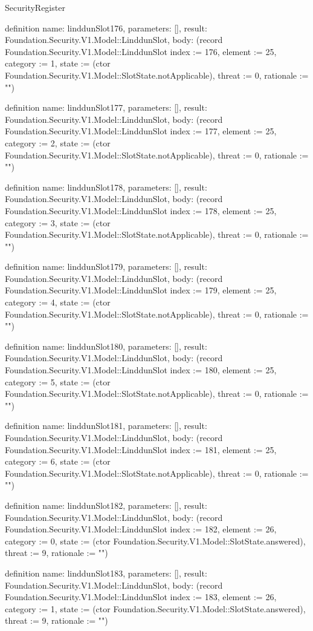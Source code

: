\begin{lexlean}{SecurityRegister}
\begin{semanticmodule}
definition{
  name: linddunSlot176,
  parameters: [],
  result: Foundation.Security.V1.Model::LinddunSlot,
  body: (record Foundation.Security.V1.Model::LinddunSlot {index := 176, element := 25, category := 1, state := (ctor Foundation.Security.V1.Model::SlotState.notApplicable), threat := 0, rationale := ""})
}

definition{
  name: linddunSlot177,
  parameters: [],
  result: Foundation.Security.V1.Model::LinddunSlot,
  body: (record Foundation.Security.V1.Model::LinddunSlot {index := 177, element := 25, category := 2, state := (ctor Foundation.Security.V1.Model::SlotState.notApplicable), threat := 0, rationale := ""})
}

definition{
  name: linddunSlot178,
  parameters: [],
  result: Foundation.Security.V1.Model::LinddunSlot,
  body: (record Foundation.Security.V1.Model::LinddunSlot {index := 178, element := 25, category := 3, state := (ctor Foundation.Security.V1.Model::SlotState.notApplicable), threat := 0, rationale := ""})
}

definition{
  name: linddunSlot179,
  parameters: [],
  result: Foundation.Security.V1.Model::LinddunSlot,
  body: (record Foundation.Security.V1.Model::LinddunSlot {index := 179, element := 25, category := 4, state := (ctor Foundation.Security.V1.Model::SlotState.notApplicable), threat := 0, rationale := ""})
}

definition{
  name: linddunSlot180,
  parameters: [],
  result: Foundation.Security.V1.Model::LinddunSlot,
  body: (record Foundation.Security.V1.Model::LinddunSlot {index := 180, element := 25, category := 5, state := (ctor Foundation.Security.V1.Model::SlotState.notApplicable), threat := 0, rationale := ""})
}

definition{
  name: linddunSlot181,
  parameters: [],
  result: Foundation.Security.V1.Model::LinddunSlot,
  body: (record Foundation.Security.V1.Model::LinddunSlot {index := 181, element := 25, category := 6, state := (ctor Foundation.Security.V1.Model::SlotState.notApplicable), threat := 0, rationale := ""})
}

definition{
  name: linddunSlot182,
  parameters: [],
  result: Foundation.Security.V1.Model::LinddunSlot,
  body: (record Foundation.Security.V1.Model::LinddunSlot {index := 182, element := 26, category := 0, state := (ctor Foundation.Security.V1.Model::SlotState.answered), threat := 9, rationale := ""})
}

definition{
  name: linddunSlot183,
  parameters: [],
  result: Foundation.Security.V1.Model::LinddunSlot,
  body: (record Foundation.Security.V1.Model::LinddunSlot {index := 183, element := 26, category := 1, state := (ctor Foundation.Security.V1.Model::SlotState.answered), threat := 9, rationale := ""})
}


\end{semanticmodule}
\end{lexlean}
